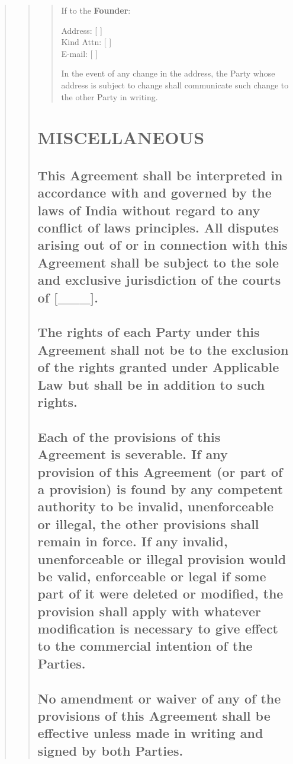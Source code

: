 \documentclass[
]{article}
\begin{document}
\begin{quote}
\begin{quote}
\begin{quote}
If to the \textbf{Founder}:

Address: {[} {]}\\
Kind Attn: {[} {]}\\
E-mail: {[} {]}

In the event of any change in the address, the Party whose address is
subject to change shall communicate such change to the other Party in
writing.
\end{quote}

\section{MISCELLANEOUS}

\subsection{ This Agreement shall be interpreted in accordance with and governed
by the laws of India without regard to any conflict of laws principles.
All disputes arising out of or in connection with this Agreement shall
be subject to the sole and exclusive jurisdiction of the courts of
{[}\_\_\_{]}.}

\subsection{The rights of each Party under this Agreement shall not be to the
exclusion of the rights granted under Applicable Law but shall be in
addition to such rights.} 

\subsection{Each of the provisions of this Agreement is severable. If any provision
of this Agreement (or part of a provision) is found by any competent
authority to be invalid, unenforceable or illegal, the other provisions
shall remain in force. If any invalid, unenforceable or illegal provision
would be valid, enforceable or legal if some part of it were deleted or
modified, the provision shall apply with whatever modification is
necessary to give effect to the commercial intention of the Parties.}

\subsection{No amendment or waiver of any of the provisions of this Agreement
shall be effective unless made in writing and signed by both Parties.}


\end{quote}
\end{quote}
\end{document}

